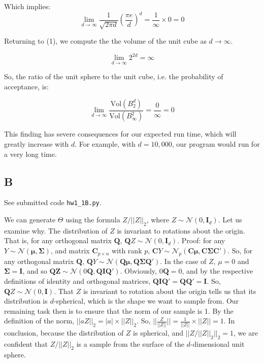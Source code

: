 \documentclass{report}
\begin{document}
Which implies:
\begin{equation}
\lim_{d \to \infty} \frac{1}{\sqrt{2\pi d}} \left( \frac{\pi e}{d} \right)^d =
	\frac{1}{\infty} \times 0 = 0
\end{equation}

Returning to (1), we compute the the volume of the unit cube as $d \to \infty$.

\begin{equation}
\lim_{d \to \infty} 2^{2d} = \infty
\end{equation}

So, the ratio of the unit sphere to the unit cube, i.e. the probability of
acceptance, is:

\begin{equation}
\lim_{d \to \infty} \frac{\mathrm{Vol}(B^d_2)}{\mathrm{Vol}(B^2_\infty)} =
\frac{0}{\infty} = 0
\end{equation}

This finding has severe consequences for our expected run time, which will
greatly increase with $d$. For example, with $d=10,000$, our
program would run for a very long time. 

\subsection*{B}
See submitted code \texttt{hw1\_1B.py}.

We can generate $\Theta$ using the
formula $Z / ||Z||_2$, where $Z \sim \mathcal{N}(0,
\mathbf{I}_d)$. Let us examine why. The distribution of
$Z$ is invariant to rotations about the origin. That is, for any orthogonal matrix
$\mathbf{Q}$, $\mathbf{Q}Z \sim \mathcal{N}(0, \mathbf{I}_d)$. Proof: for any
$Y \sim \mathcal{N}(\mathbf{\mu}, \mathbf{\Sigma})$, and  matrix $\mathbf{C}_{p
\times n}$ with rank $p$, $\mathbf{C}Y \sim \mathcal{N}_p (\mathbf{C\mu}, \mathbf{C\Sigma
C'})$. So, for any orthogonal matrix $\mathbf{Q}$, $\mathbf{Q}Y \sim
\mathcal{N}(\mathbf{Q\mu}, \mathbf{Q\Sigma Q'})$. In the case of $Z$,
$\mu = 0$ and $\mathbf{\Sigma} = \mathbf{I}$, and so $\mathbf{QZ} \sim
\mathcal{N}(0\mathbf{Q}, \mathbf{QIQ'})$. Obviously, $0\mathbf{Q}=0$, and by the
respective definitions of identity and orthogonal matrices,
$\mathbf{QIQ}'=\mathbf{QQ}'=\mathbf{I}$. So, $\mathbf{Q}Z \sim \mathcal{N}(0,
\mathbf{I})$. That $Z$ is invariant to rotation about the origin tells
us that its distribution is $d$-spherical, which is the shape we want to sample
from. Our remaining task then is to ensure that the norm of our sample is 1. By the
definition of the norm, $||aZ||_2 = |a|\times||Z||_2$. So, $||\frac{Z}{||Z||}||
= \frac{1}{||Z||} \times ||Z|| = 1$. In conclusion, because the distribution of
$Z$ is spherical, and $||Z / ||Z||_2||_2 = 1$, we are
confident that $Z / ||Z||_2$ is a sample from the surface of the $d$-dimensional
unit sphere.
\end{document}
